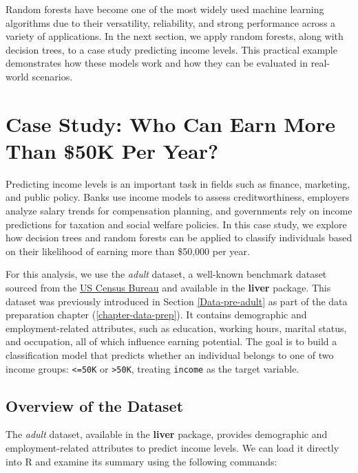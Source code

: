 \documentclass[
]{book}
\newcommand{\passthrough}[1]{#1}
\theoremstyle{definition}
\theoremstyle{definition}
\theoremstyle{definition}
\theoremstyle{definition}
\theoremstyle{remark}
\begin{document}
Random forests have become one of the most widely used machine learning algorithms due to their versatility, reliability, and strong performance across a variety of applications. In the next section, we apply random forests, along with decision trees, to a case study predicting income levels. This practical example demonstrates how these models work and how they can be evaluated in real-world scenarios.

\section{Case Study: Who Can Earn More Than \$50K Per Year?}\label{tree-case-study}

Predicting income levels is an important task in fields such as finance, marketing, and public policy. Banks use income models to assess creditworthiness, employers analyze salary trends for compensation planning, and governments rely on income predictions for taxation and social welfare policies. In this case study, we explore how decision trees and random forests can be applied to classify individuals based on their likelihood of earning more than \$50,000 per year.

For this analysis, we use the \emph{adult} dataset, a well-known benchmark dataset sourced from the \href{https://www.census.gov}{US Census Bureau} and available in the \textbf{liver} package. This dataset was previously introduced in Section \ref{Data-pre-adult} as part of the data preparation chapter (\ref{chapter-data-prep}). It contains demographic and employment-related attributes, such as education, working hours, marital status, and occupation, all of which influence earning potential. The goal is to build a classification model that predicts whether an individual belongs to one of two income groups: \passthrough{\lstinline!<=50K!} or \passthrough{\lstinline!>50K!}, treating \passthrough{\lstinline!income!} as the target variable.

\subsection*{Overview of the Dataset}\label{overview-of-the-dataset-1}

The \emph{adult} dataset, available in the \textbf{liver} package, provides demographic and employment-related attributes to predict income levels. We can load it directly into R and examine its summary using the following commands:
\end{document}

